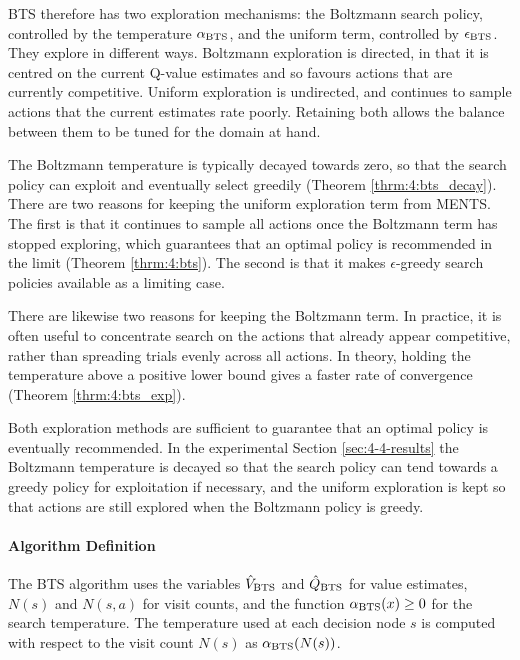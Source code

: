    BTS therefore has two exploration mechanisms: the Boltzmann search policy, controlled by the temperature ${\alpha_{{\textnormal{BTS}}}}$, and the uniform term, controlled by ${\epsilon_{{\textnormal{BTS}}}}$. They explore in different ways. Boltzmann exploration is directed, in that it is centred on the current Q-value estimates and so favours actions that are currently competitive. Uniform exploration is undirected, and continues to sample actions that the current estimates rate poorly. Retaining both allows the balance between them to be tuned for the domain at hand.

    The Boltzmann temperature is typically decayed towards zero, so that the search policy can exploit and eventually select greedily (Theorem \mbox{\ref{thrm:4:bts_decay}}). There are two reasons for keeping the uniform exploration term from MENTS. The first is that it continues to sample all actions once the Boltzmann term has stopped exploring, which guarantees that an optimal policy is recommended in the limit (Theorem \mbox{\ref{thrm:4:bts}}). The second is that it makes \mbox{$\epsilon$-greedy} search policies available as a limiting case. 
    
    There are likewise two reasons for keeping the Boltzmann term. In practice, it is often useful to concentrate search on the actions that already appear competitive, rather than spreading trials evenly across all actions. In theory, holding the temperature above a positive lower bound gives a faster rate of convergence (Theorem \mbox{\ref{thrm:4:bts_exp}}).

    Both exploration methods are sufficient to guarantee that an optimal policy is eventually recommended. In the experimental Section \ref{sec:4-4-results} the Boltzmann temperature is decayed so that the search policy can tend towards a greedy policy for exploitation if necessary, and the uniform exploration is kept so that actions are still explored when the Boltzmann policy is greedy.

    \paragraph{Algorithm Definition}

    The BTS algorithm uses the variables ${\hat{V}_{{\textnormal{BTS}}}}$ and ${\hat{Q}_{{\textnormal{BTS}}}}$ for value estimates, $N(s)$ and $N(s,a)$ for visit counts, and the function \mbox{${\alpha_{{\textnormal{BTS}}}}(x)\geq 0$} for the search temperature. The temperature used at each decision node $s$ is computed with respect to the visit count $N(s)$ as ${\alpha_{{\textnormal{BTS}}}}(N(s))$.

